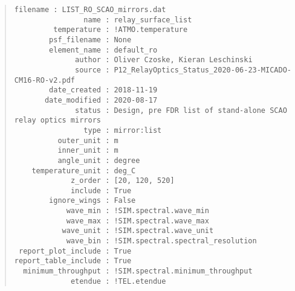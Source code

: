 \begin{quote}
\begin{alltt}
\begin{lstlisting}[frame=single]
            filename : LIST_RO_SCAO_mirrors.dat
                name : relay_surface_list
         temperature : !ATMO.temperature
        psf_filename : None
        element_name : default_ro
              author : Oliver Czoske, Kieran Leschinski
              source : P12_RelayOptics_Status_2020-06-23-MICADO-CM16-RO-v2.pdf
        date_created : 2018-11-19
       date_modified : 2020-08-17
              status : Design, pre FDR list of stand-alone SCAO relay optics mirrors
                type : mirror:list
          outer_unit : m
          inner_unit : m
          angle_unit : degree
    temperature_unit : deg_C
             z_order : [20, 120, 520]
             include : True
        ignore_wings : False
            wave_min : !SIM.spectral.wave_min
            wave_max : !SIM.spectral.wave_max
           wave_unit : !SIM.spectral.wave_unit
            wave_bin : !SIM.spectral.spectral_resolution
 report_plot_include : True
report_table_include : True
  minimum_throughput : !SIM.spectral.minimum_throughput
             etendue : !TEL.etendue
\end{lstlisting}
\end{alltt}
\end{quote}
